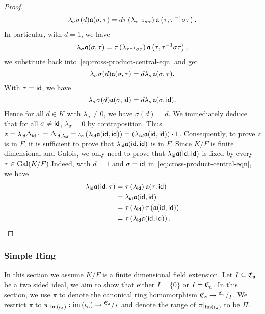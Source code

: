 \begin{proof}
\begin{equation}
    \lambda_{\sigma}\sigma(d)\mathfrak{a}(\sigma,\tau) = d\tau\left(\lambda_{\tau^{-1}\sigma\tau}\right)\mathfrak{a}\left(\tau,\tau^{-1}\sigma\tau\right).
  \end{equation}
  In particular, with $d = 1$, we have
  \[
    \lambda_{\sigma}\mathfrak{a}(\sigma,\tau) = \tau\left(\lambda_{\tau^{-1}\sigma\tau}\right)\mathfrak{a}\left(\tau,\tau^{-1}\sigma\tau\right),
  \]
  we substitute back into~\cref{eq:cross-product-central-eqn} and get
  \[
    \lambda_{\sigma}\sigma(d)\mathfrak{a}(\sigma,\tau) = d\lambda_{\sigma}\mathfrak{a}(\sigma,\tau).
  \]
  With $\tau = \mathsf{id}$, we have
  \[
    \lambda_{\sigma}\sigma(d)\mathfrak{a}(\sigma,\mathsf{id})=d\lambda_{\sigma}\mathfrak{a}(\sigma,\mathsf{id}),
  \]
  Hence for all $d \in K$ with $\lambda_{\sigma} \ne 0$, we have $\sigma(d) = d$. We immediately deduce that for all $\sigma \ne \mathsf{id}$, $\lambda_{\sigma} = 0$ by contraposition. Thus $z = \lambda_{\mathsf{id}}\Delta_{\mathsf{id}, 1} = \Delta_{\mathsf{id},\lambda_{\mathsf{id}}} = \iota_{\mathfrak{a}}\left(\lambda_{\mathsf{id}}\mathfrak{a}(\mathsf{id},\mathsf{id})\right) = \left(\lambda_{id}\mathfrak{a}(\mathsf{id},\mathsf{id})\right) \cdot 1$. Consequently, to prove $z$ is in $F$, it is sufficient to prove that $\lambda_{\mathsf{id}}\mathfrak{a}(\mathsf{id},\mathsf{id})$ is in $F$. Since $K/F$ is finite dimensional and Galois, we only need to prove that $\lambda_{\mathsf{id}}\mathfrak{a}(\mathsf{id},\mathsf{id})$ is fixed by every $\tau\in\operatorname{Gal}(K/F)$.Indeed, with $d = 1$ and $\sigma = \mathsf{id}$ in~\cref{eq:cross-product-central-eqn}, we have
  \[
    \begin{aligned}
      \lambda_{\mathsf{id}}\mathfrak{a}(\mathsf{id},\tau) &= \tau\left(\lambda_{\mathsf{id}}\right)\mathfrak{a}(\tau,\mathsf{id})\\
      &= \lambda_{\mathsf{id}}\mathfrak{a}(\mathsf{id},\mathsf{id}) \\ &= \tau\left(\lambda_{\mathsf{id}}\right)\tau\left(\mathfrak{a}(\mathsf{id},\mathsf{id})\right)\\
      &= \tau\left(\lambda_{\mathsf{id}}\mathfrak{a}(\mathsf{id},\mathsf{id})\right).
    \end{aligned}
  \]

\end{proof}


\subsubsection{Simple Ring}
In this section we assume $K/F$ is a finite dimensional field extension. Let $I \subseteq \operatorname{\mathfrak{C}}_{\mathfrak{a}}$ be a two sided ideal, we aim to show that either $I = \{0\}$ or $I = \operatorname{\mathfrak{C}}_{\mathfrak{a}}$. In this section, we use $\pi$ to denote the canonical ring homomorphism $\operatorname{\mathfrak{C}}_{\mathfrak{a}}\to{}^{\operatorname{\mathfrak{C}}_{\mathfrak{a}}}/_{I}$. We restrict $\pi$ to $\pi|_{\operatorname{im}\left(\iota_{\mathfrak{a}}\right)} : \operatorname{im}\left(\iota_{\mathfrak{a}}\right) \to {}^{\operatorname{\mathfrak{C}}_{\mathfrak{a}}}/_{I}$ and denote the range of $\pi|_{\operatorname{im}\left(\iota_{\mathfrak{a}}\right)}$ to be $\Pi$.

